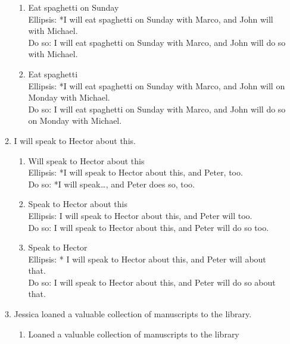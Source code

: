 \documentclass[a4paper,12pt]{article}
\begin{document}
\begin{enumerate}
\begin{enumerate}[label=(\alph*)]
\begin{enumerate}[label=(\roman*)]
            \item Eat spaghetti on Sunday\\
               Ellipsis: *I will eat spaghetti on Sunday with Marco, and John will with Michael.\\
               Do so: I will eat spaghetti on Sunday with Marco, and John will do so with Michael.

            \item Eat spaghetti\\
               Ellipsis: *I will eat spaghetti on Sunday with Marco, and John will on Monday with Michael.\\
               Do so: I will eat spaghetti on Sunday with Marco, and John will do so on Monday with Michael.
         \end{enumerate}
         
         \item I will speak to Hector about this.
            \begin{enumerate}[label=(\roman*)]
               \item Will speak to Hector about this\\
                  Ellipsis: *I will speak to Hector about this, and Peter, too.\\
                  Do so: *I will speak\dots, and Peter does so, too.
                  
               \item Speak to Hector about this\\
                  Ellipsis: I will speak to Hector about this, and Peter will too.\\
                  Do so: I will speak to Hector about this, and Peter will do so too.

               \item Speak to Hector\\
                  Ellipsis: * I will speak to Hector about this, and Peter will about that.\\
                  Do so: I will speak to Hector about this, and Peter will do so about that.

            \end{enumerate}
            
         \item Jessica loaned a valuable collection of manuscripts to the library.
            \begin{enumerate}[label=(\roman*)]
               \item Loaned a valuable collection of manuscripts to the library


\end{enumerate}
\end{enumerate}
\end{enumerate}
\end{document}
